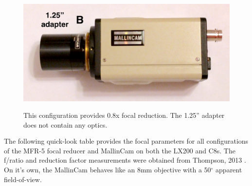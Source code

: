 \documentclass[12pt,titlepage]{article}
\renewcommand\deg{\mbox{$^\circ$}}
\begin{document}
\begin{appendix}
\begin{figure}[H]
\begin{center}
		\includegraphics[width=.6\textwidth]{./images/mallincam/focal_reduction/B_adapter.jpg} 
		\label{mfr5_B}
		\caption{This configuration provides 0.8x focal reduction.
				The 1.25'' adapter does not contain any optics.}
	\end{center}
\end{figure}
The following quick-look table provides the focal parameters for all configurations
of the MFR-5 focal reducer and MallinCam on both the LX200 and C8s.
The f/ratio and reduction factor measurements were obtained from Thompson, 2013 \cite{thompson13}.
On it's own, the MallinCam behaves like an 8mm objective with a 50$\deg$ apparent field-of-view.


\end{appendix}
\end{document}
